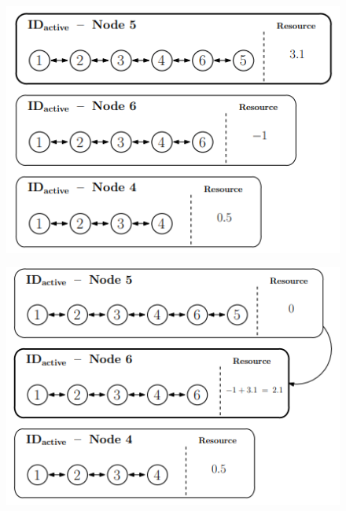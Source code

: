 \begin{figure}[h!]
  \centering
  \begin{minipage}{0.5\textwidth}
    \centering
    \includegraphics[width=\linewidth]{img/teoria/distri1.png}
    \label{fig:distri1}
  \end{minipage}\hfill
  \begin{minipage}{0.5\textwidth}
    \centering
    \includegraphics[width=\linewidth]{img/teoria/distri2.png}
    \label{fig:distri2}
  \end{minipage}\hfill
  \begin{minipage}{0.5\textwidth}
    \centering

\end{minipage}
\end{figure}
